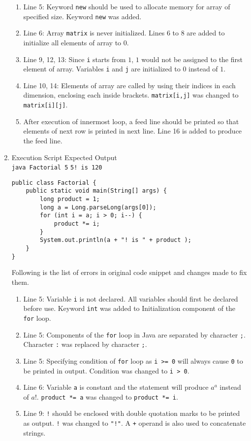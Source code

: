 \begin{enumerate}[label=\textbf{(\alph*)}]
\begin{enumerate}[label=\arabic*.]
\item Line 5: Keyword \texttt{new} should be used to allocate memory for array of specified size. Keyword \texttt{new} was added.
\item Line 6: Array \texttt{matrix} is never initialized. Lines 6 to 8 are added to initialize all elements of array to 0.
\item Line 9, 12, 13: Since \texttt{i} starts from $1$, $1$ would not be assigned to the first element of array. Variables \texttt{i} and \texttt{j} are initialized to $0$ instead of $1$.
\item Line 10, 14: Elements of array are called by using their indices in each dimension, enclosing each inside brackets. \texttt{matrix[i,j]} was changed to \texttt{matrix[i][j]}.
\item After execution of innermost loop, a feed line should be printed so that elements of next row is printed in next line. Line 16 is added to produce the feed line.
\end{enumerate}

\item Execution Script \hfill Expected Output\\
\texttt{java Factorial 5} \hfill \texttt{5! is 120}

\begin{lstlisting}
public class Factorial {
	public static void main(String[] args) {
		long product = 1;
		long a = Long.parseLong(args[0]);
		for (int i = a; i > 0; i--) {
			product *= i;
		}
		System.out.println(a + "! is " + product );
	}
}
\end{lstlisting}

Following is the list of errors in original code snippet and changes made to fix them.

\begin{enumerate}[label=\arabic*.]
\item Line 5: Variable \texttt{i} is not declared. All variables should first be declared before use. Keyword \texttt{int} was added to Initialization component of the \texttt{for} loop.
\item Line 5: Components of the \texttt{for} loop in Java are separated by character \texttt{;}. Character \texttt{:} was replaced by character \texttt{;}.
\item Line 5: Specifying condition of \texttt{for} loop as \texttt{i >= 0} will always cause \texttt{0} to be printed in output. Condition was changed to \texttt{i > 0}.
\item Line 6: Variable \texttt{a} is constant and the statement will produce $a^a$ instead of $a!$. \texttt{product *= a} was changed to \texttt{product *= i}.
\item Line 9: \texttt{!} should be enclosed with double quotation marks to be printed as output. \texttt{!} was changed to \texttt{"!"}. A \texttt{+} operand is also used to concatenate strings.
\end{enumerate}

\end{enumerate}

